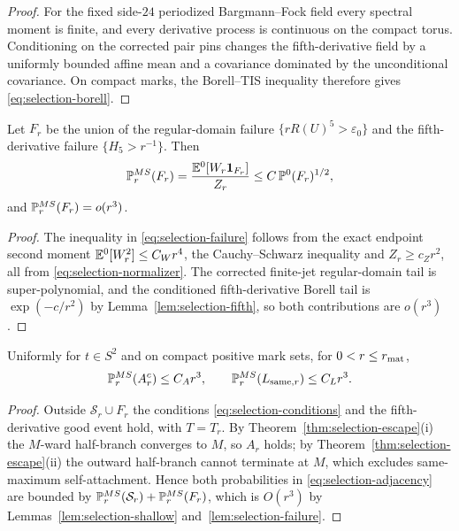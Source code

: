 \begin{proof}
For the fixed side-$24$ periodized Bargmann--Fock field every spectral moment is finite, and every derivative process is continuous on the compact torus. Conditioning on the corrected pair pins changes the fifth-derivative field by a uniformly bounded affine mean and a covariance dominated by the unconditional covariance. On compact marks, the Borell--TIS inequality \cite{AdlerTaylor} therefore gives \eqref{eq:selection-borell}.
\end{proof}

\begin{lemma}\label{lem:selection-failure}
Let $F_r$ be the union of the regular-domain failure $\{rR(U)^5>\varepsilon_0\}$ and the fifth-derivative failure $\{H_5>r^{-1}\}$. Then
\begin{equation}\label{eq:selection-failure}
\mathbb P^{MS}_r(F_r)=\frac{\mathbb E^0[W_r\mathbf 1_{F_r}]}{Z_r}\le C\,\mathbb P^0(F_r)^{1/2},
\end{equation}
and $\mathbb P^{MS}_r(F_r)=o(r^3)$.
\end{lemma}

\begin{proof}
The inequality in \eqref{eq:selection-failure} follows from the exact endpoint second moment $\mathbb E^0[W_r^2]\le C_Wr^4$, the Cauchy--Schwarz inequality and $Z_r\ge c_Zr^2$, all from \eqref{eq:selection-normalizer}. The corrected finite-jet regular-domain tail is super-polynomial, and the conditioned fifth-derivative Borell tail is $\exp(-c/r^2)$ by Lemma~\ref{lem:selection-fifth}, so both contributions are $o(r^3)$.
\end{proof}

\begin{proposition}\label{prop:selection-adjacency}
Uniformly for $t\in S^2$ and on compact positive mark sets, for $0<r\le r_{\rm mat}$,
\begin{equation}\label{eq:selection-adjacency}
\mathbb P^{MS}_r(A_r^c)\le C_Ar^3,\qquad\mathbb P^{MS}_r(L_{{\rm same},r})\le C_Lr^3 .
\end{equation}
\end{proposition}

\begin{proof}
Outside $\mathcal S_r\cup F_r$ the conditions \eqref{eq:selection-conditions} and the fifth-derivative good event hold, with $T=T_r$. By Theorem~\ref{thm:selection-escape}(i) the $M$-ward half-branch converges to $M$, so $A_r$ holds; by Theorem~\ref{thm:selection-escape}(ii) the outward half-branch cannot terminate at $M$, which excludes same-maximum self-attachment. Hence both probabilities in \eqref{eq:selection-adjacency} are bounded by $\mathbb P^{MS}_r(\mathcal S_r)+\mathbb P^{MS}_r(F_r)$, which is $O(r^3)$ by Lemmas~\ref{lem:selection-shallow} and~\ref{lem:selection-failure}.
\end{proof}

